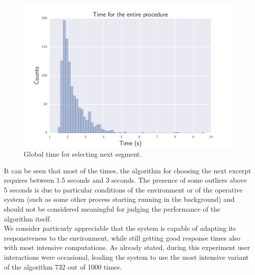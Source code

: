 \begin{figure}[h]
\begin{center}
\includegraphics[scale=0.7]{Figures/bench_procedure.pdf}
  \caption[Global time for selecting next segment]{Global time for selecting next segment.}
  \label{fig:step7}
\end{center}
\end{figure}

It can be seen that most of the times, the algorithm for choosing the next excerpt requires between 1.5 seconds and 3 seconds. The presence of some outliers above 5 seconds is due to particular conditions of the environment or of the operative system (such as some other process starting running in the background) and should not be considered meaningful for judging the performance of the algorithm itself. \\
We consider particurly appreciable that the system is capable of adapting its responsiveness to the environment, while still getting good response times also with most intensive computations. As already stated, during this  experiment user interactions were occasional, leading the system to use the most intensive variant of the algorithm 732 out of 1000 times.\\ \\ 

